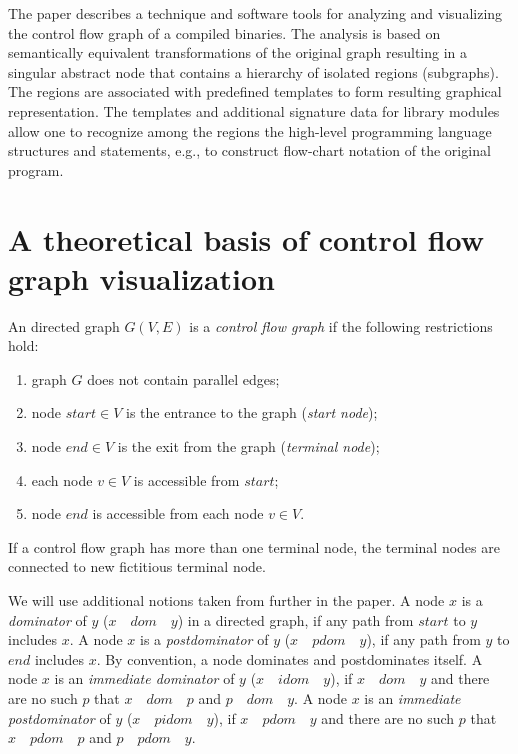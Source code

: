 \documentclass[conference]{IEEEtran}
\begin{document}
The paper describes a technique and software tools for analyzing and visualizing the control flow graph of a compiled binaries.  The analysis is based on semantically equivalent transformations of the original graph resulting in a singular abstract node that contains a hierarchy of isolated regions (subgraphs).  The regions are associated with predefined templates to form resulting graphical representation.  The templates and additional signature data for library modules allow one to recognize among the regions the high-level programming language structures and statements, e.g., to construct flow-chart notation of the original program.

\section{A theoretical basis of control flow\\ graph visualization}

An directed graph $G(V,E)$ is a \emph{control flow graph} if the following restrictions hold:
\begin{enumerate}
\item graph $G$ does not contain parallel edges;
\item node $start\in V$ is the entrance to the graph (\emph{start node});
\item node $end \in V$ is the exit from the graph (\emph{terminal node});
\item each node $v \in V$ is accessible from $start$;
\item node $end$ is accessible from each node $v \in V$.
\end{enumerate}
If a control flow graph has more than one terminal node, the terminal nodes are connected to new fictitious terminal node.

We will use additional notions taken from \cite{sese} further in the paper.  A node $x$ is a \emph{dominator} of $y$ ($x\quad dom\quad y$) in a directed graph, if any path from $start$ to $y$ includes $x$.  A node $x$ is a \emph{postdominator} of $y$ ($x\quad pdom\quad y$), if any path from $y$ to $end$ includes $x$.  By convention, a node dominates and postdominates itself.  A node $x$ is an \emph{immediate dominator} of $y$ ($x\quad idom\quad y$), if $x\quad dom\quad y$ and there are no such $p$ that $x\quad dom\quad p$ and $p\quad dom\quad y$.  A node $x$ is an \emph{immediate postdominator} of $y$ ($x\quad pidom\quad y$), if $x\quad pdom\quad y$ and there are no such $p$ that $x\quad pdom\quad p$ and $p\quad pdom\quad y$.
\end{document}
